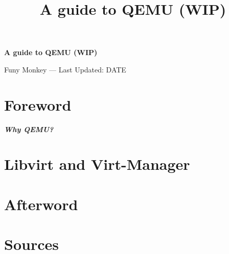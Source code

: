 \documentclass{article}
\title{A guide to QEMU (WIP)}
\renewcommand{\maketitle}{
	\begin{center}
		{\huge\bfseries
		A guide to QEMU (WIP)}
		\vspace{.25em}

		Funy Monkey --- Last Updated: DATE 
	\end{center}
}
\begin{document}
\maketitle
\tableofcontents

\section{Foreword}
	\textbf{\textit{Why QEMU?}}

\section{Libvirt and Virt-Manager}
\section{Afterword}
\section{Sources}
\end{document}
